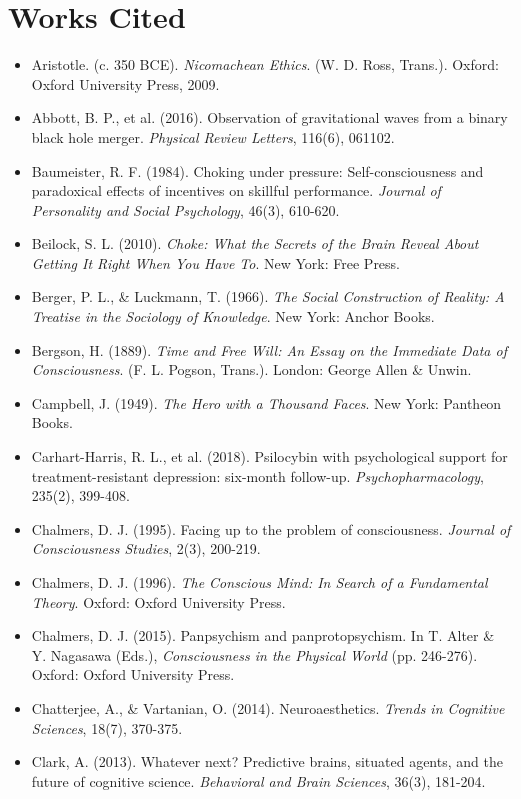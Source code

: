 \section*{Works Cited}


\begin{itemize}[nosep,leftmargin=*]
  \item Aristotle. (c. 350 BCE). \textit{Nicomachean Ethics}. (W. D. Ross, Trans.). Oxford: Oxford University Press, 2009.
  \item Abbott, B. P., et al. (2016). Observation of gravitational waves from a binary black hole merger. \textit{Physical Review Letters}, 116(6), 061102.
  \item Baumeister, R. F. (1984). Choking under pressure: Self-consciousness and paradoxical effects of incentives on skillful performance. \textit{Journal of Personality and Social Psychology}, 46(3), 610-620.
  \item Beilock, S. L. (2010). \textit{Choke: What the Secrets of the Brain Reveal About Getting It Right When You Have To}. New York: Free Press.
  \item Berger, P. L., \& Luckmann, T. (1966). \textit{The Social Construction of Reality: A Treatise in the Sociology of Knowledge}. New York: Anchor Books.
  \item Bergson, H. (1889). \textit{Time and Free Will: An Essay on the Immediate Data of Consciousness}. (F. L. Pogson, Trans.). London: George Allen \& Unwin.
  \item Campbell, J. (1949). \textit{The Hero with a Thousand Faces}. New York: Pantheon Books.
  \item Carhart-Harris, R. L., et al. (2018). Psilocybin with psychological support for treatment-resistant depression: six-month follow-up. \textit{Psychopharmacology}, 235(2), 399-408.
  \item Chalmers, D. J. (1995). Facing up to the problem of consciousness. \textit{Journal of Consciousness Studies}, 2(3), 200-219.
  \item Chalmers, D. J. (1996). \textit{The Conscious Mind: In Search of a Fundamental Theory}. Oxford: Oxford University Press.
  \item Chalmers, D. J. (2015). Panpsychism and panprotopsychism. In T. Alter \& Y. Nagasawa (Eds.), \textit{Consciousness in the Physical World} (pp. 246-276). Oxford: Oxford University Press.
  \item Chatterjee, A., \& Vartanian, O. (2014). Neuroaesthetics. \textit{Trends in Cognitive Sciences}, 18(7), 370-375.
  \item Clark, A. (2013). Whatever next? Predictive brains, situated agents, and the future of cognitive science. \textit{Behavioral and Brain Sciences}, 36(3), 181-204.

\end{itemize}

